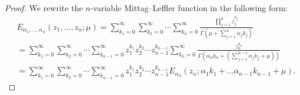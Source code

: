 \documentclass[12pt, reqno]{amsart}
\theoremstyle{definition}
\theoremstyle{remark}
\numberwithin{equation}{section}
\begin{document}
\begin{proof}
We rewrite the $n$-variable Mittag--Leffler function in the following form:
\begin{equation}\label{5.2}
\begin{aligned}
&
E_{\alpha_1,\dots,\alpha_n}(z_1,\dots,z_n;\mu)
=
\sum_{k_1=0}^{\infty}
\sum_{k_2=0}^{\infty}\cdots
\sum_{k_n=0}^{\infty}
\frac{\prod\limits_{j=1}^{n}z_j^{k_j}}
{\Gamma\!\left(\mu+\sum_{j=1}^{n}\alpha_jk_j\right)}\\
&=
\sum_{k_1=0}^{\infty}
\sum_{k_2=0}^{\infty}\cdots\sum_{k_{n-1}=0}^{\infty}z_1^{k_1}z_2^{k_2}\cdots z_{n-1}^{k_{n-1}}
\sum_{k_n=0}^{\infty}
\frac{z_n^{k_n}}
{\Gamma\!\left(\alpha_nk_n+\left(\sum_{j=1}^{n-1}\alpha_jk_j+\mu\right)\right)}\\
&=\sum_{k_1=0}^{\infty}
\sum_{k_2=0}^{\infty}\cdots\sum_{k_{n-1}=0}^{\infty}z_1^{k_1}z_2^{k_2}\cdots z_{n-1}^{k_{n-1}}E_{\alpha_n}(z_n;\alpha_1k_1+\dots\alpha_{n-1}k_{n-1}+\mu).
\end{aligned}\end{equation}


\end{proof}
\end{document}
